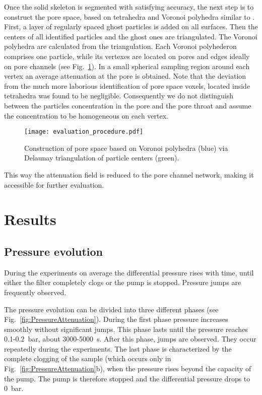 \documentclass[smallextended]{svjour3}       %
\begin{document}
Once the solid skeleton is segmented with satisfying accuracy, the next step is to construct the pore space, based on tetrahedra and Voronoi polyhedra similar to \cite{Wang-etal-2012,Melnikov-etal_2015}. First, a layer of regularly spaced ghost particles is added on all surfaces. Then the centers of all identified particles and the ghost ones are triangulated. The Voronoi polyhedra are calculated from the triangulation. Each Voronoi polyhederon comprises one particle, while its vertexes are located on pores and edges ideally on pore channels (see Fig.~\ref{fig:evalproc}). In a small spherical sampling region around each vertex an average attenuation at the pore is obtained. Note that the deviation from the much more laborious identification of pore space voxels, located inside tetrahedra was found to be negligible. Consequently we do not distinguish between the particles concentration in the pore and the pore throat and assume the concentration to be homogeneous on each vertex. 
\begin {figure}[!hbtp]
\texttt{[image: evaluation\_procedure.pdf]}
\caption{\label{fig:evalproc} Construction of pore space based on Voronoi polyhedra (blue) via Delaunay triangulation of particle centers (green). }
\end{figure}
This way the attenuation field is reduced to the pore channel network, making it accessible for further evaluation.
\section{Results}\label{sec:results}
\subsection{Pressure evolution}\label{subsec:pressure}
During the experiments on average the differential pressure rises with time, until either the filter completely clogs or the pump is stopped. Pressure jumps are frequently observed.

The pressure evolution can be divided into three different phases (see Fig.~\ref{fig:PressureAttenuation}). During the first phase pressure increases smoothly without significant jumps. This phase lasts until the pressure reaches 0.1-0.2~bar, about 3000-5000~s. After this phase, jumps are observed. They occur repeatedly during the experiments. The last phase is characterized by the complete clogging of the sample (which occurs only in Fig.~\ref{fig:PressureAttenuation}b), when the pressure rises beyond the capacity of the pump. The pump is therefore stopped and the differential pressure drops to 0~bar.
\end{document}
